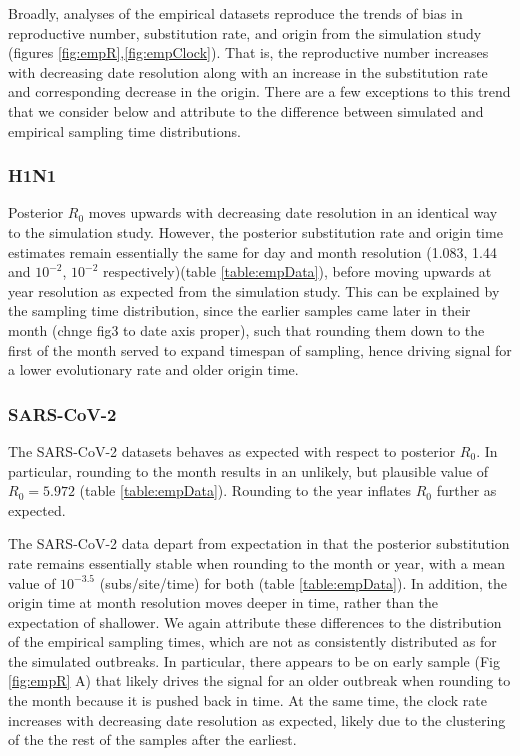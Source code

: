 \documentclass{article}
\begin{document}
\begin{spacing}{1.5}
Broadly, analyses of the empirical datasets reproduce the trends of bias in reproductive number, substitution rate, and origin from the simulation study (figures \ref{fig:empR},\ref{fig:empClock}). That is, the reproductive number increases with decreasing date resolution along with an increase in the substitution rate and corresponding decrease in the origin. There are a few exceptions to this trend that we consider below and attribute to the difference between simulated and empirical sampling time distributions.

\subsubsection*{H1N1}
Posterior $R_0$ moves upwards with decreasing date resolution in an identical way to the simulation study. However, the posterior substitution rate and origin time estimates remain essentially the same for day and month resolution (1.083, 1.44 and $10^{-2}$, $10^{-2}$ respectively)(table \ref{table:empData}),  before moving upwards at year resolution as expected from the simulation study. This can be explained by the sampling time distribution, since the earlier samples came later in their month (chnge fig3 to date axis proper), such that rounding them down to the first of the month served to expand timespan of sampling, hence driving signal for a lower evolutionary rate and older origin time.

\subsubsection*{SARS-CoV-2}
The SARS-CoV-2 datasets behaves as expected with respect to posterior $R_0$. In particular, rounding to the month results in an unlikely, but plausible value of $R_0 = 5.972$ (table \ref{table:empData}). Rounding to the year inflates $R_0$ further as expected.

The SARS-CoV-2 data depart from expectation in that the posterior substitution rate remains essentially stable when rounding to the month or year, with a mean value of $10^{-3.5}$ (subs/site/time) for both (table \ref{table:empData}). In addition, the origin time at month resolution moves deeper in time, rather than the expectation of shallower. We again attribute these differences to the distribution of the empirical sampling times, which are not as consistently distributed as for the simulated outbreaks. In particular, there appears to be on early sample (Fig \ref{fig:empR} A) that likely drives the signal for an older outbreak when rounding to the month because it is pushed back in time. At the same time, the clock rate increases with decreasing date resolution as expected, likely due to the clustering of the the rest of the samples after the earliest.


\end{spacing}
\end{document}
